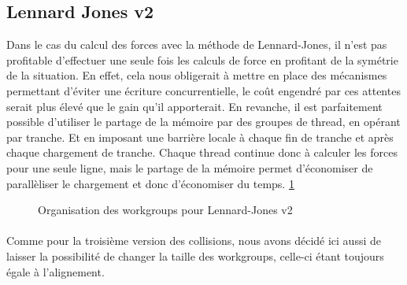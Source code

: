 \documentclass{article}
\begin{document}
\subsection{Lennard Jones v2}
Dans le cas du calcul des forces avec la méthode de Lennard-Jones, il n'est pas
profitable d'effectuer une seule fois les calculs de force en profitant de la
symétrie de la situation. En effet, cela nous obligerait à mettre en place des
mécanismes permettant d'éviter une écriture concurrentielle, le coût engendré
par ces attentes serait plus élevé que le gain qu'il apporterait.
En revanche, il est parfaitement possible d'utiliser le partage de la mémoire
par des groupes de thread, en opérant par tranche. Et en imposant une barrière
locale à chaque fin de tranche et après chaque chargement de tranche.
Chaque thread continue donc à calculer les forces pour une seule ligne, mais le
partage de la mémoire permet d'économiser de parallèliser le chargement et donc
d'économiser du temps. \ref{lennard-jones-v2}
\begin{figure}[p]
  \caption{Organisation des workgroups pour Lennard-Jones v2}
  \label{lennard-jones-v2}
\end{figure}
\paragraph{}
Comme pour la troisième version des collisions, nous avons décidé ici aussi de
laisser la possibilité de changer la taille des workgroups, celle-ci étant
toujours égale à l'alignement.
\end{document}
